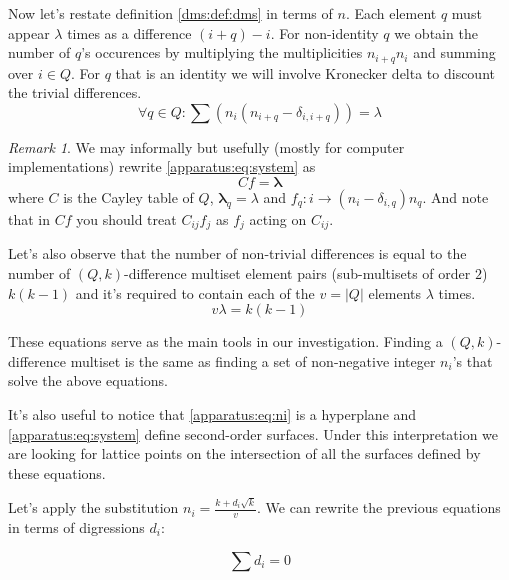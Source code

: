 \documentclass{article}
\theoremstyle{plain}
\theoremstyle{definition}
\theoremstyle{remark}
\newtheorem{remark}[theorem]{Remark}
\begin{document}
		Now let's restate definition \ref{dms:def:dms} in terms of $n$. Each element $q$ must appear $\lambda$ times as a difference $(i+q)-i$. For non-identity $q$ we obtain the number of $q$'s occurences by multiplying the multiplicities $n_{i+q} n_i$ and summing over $i \in Q$. For $q$ that is an identity we will involve Kronecker delta to discount the trivial differences.
		\begin{equation}
			\label{apparatus:eq:system}
			\forall q \in Q \colon \sum (n_i(n_{i+q}-\delta_{i,i+q})) = \lambda
		\end{equation}
		
		\begin{remark}
            We may informally but usefully (mostly for computer implementations) rewrite \eqref{apparatus:eq:system} as 
            \begin{equation}
                \label{apparatus:eq:matrixform}
                Cf=\boldsymbol{\lambda}
            \end{equation}
            where $C$ is the Cayley table of $Q$, $\boldsymbol{\lambda}_q = \lambda$ and $f_q: i \rightarrow (n_i - \delta_{i,q})n_q$. And note that in $Cf$ you should treat $C_{ij}f_j$ as $f_j$ acting on $C_{ij}$.
		\end{remark}
		
		Let's also observe that the number of non-trivial differences is equal to the number of $(Q,k)$-difference multiset element pairs (sub-multisets of order $2$) $k(k-1)$ and it's required to contain each of the $v=|Q|$ elements $\lambda$ times.
		\begin{equation}
			\label{apparatus:eq:parameters}
			v\lambda = k(k-1)
		\end{equation}
		
		These equations serve as the main tools in our investigation. Finding a $(Q,k)$-difference multiset is the same as finding a set of non-negative integer $n_i$'s that solve the above equations. 
		
		It's also useful to notice that \eqref{apparatus:eq:ni} is a hyperplane and \eqref{apparatus:eq:system} define second-order surfaces. Under this interpretation we are looking for lattice points on the intersection of all the surfaces defined by these equations.
		
		Let's apply the substitution $n_i=\frac{k+d_i \sqrt k}v$. We can rewrite the previous equations in terms of digressions $d_i$:
		
		\begin{equation}
			\label{apparatus:eq:di}
			\sum {d_i} = 0
		\end{equation}
		
\end{document}

